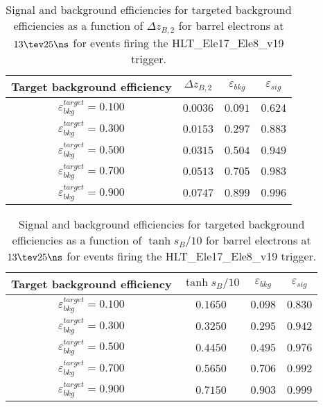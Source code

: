 \clearpage

\begin{table}[!bht]
  \begin{center}
    \begin{tabular}{cccc}
      \hline
      Target background efficiency & $\Delta z_{B,2}$ & $\varepsilon_{bkg}$ & $\varepsilon_{sig}$ \\ 
      \hline
      $\varepsilon_{bkg}^{target} = 0.100$ & $  0.0036$ & $0.091$ & $0.624$ \\
      $\varepsilon_{bkg}^{target} = 0.300$ & $  0.0153$ & $0.297$ & $0.883$ \\
      $\varepsilon_{bkg}^{target} = 0.500$ & $  0.0315$ & $0.504$ & $0.949$ \\
      $\varepsilon_{bkg}^{target} = 0.700$ & $  0.0513$ & $0.705$ & $0.983$ \\
      $\varepsilon_{bkg}^{target} = 0.900$ & $  0.0747$ & $0.899$ & $0.996$ \\
      \hline
    \end{tabular}
    \caption{Signal and background efficiencies for targeted background efficiencies as a function of $\Delta z_{B,2}$ for barrel electrons at $13\tev 25\ns$ for events firing the HLT\_Ele17\_Ele8\_v19 trigger.}
    \label{tab:eff_rej_z2B_beam_13_25_trigger_17_8_B}
  \end{center}
\end{table}

\clearpage

\begin{table}[!bht]
  \begin{center}
    \begin{tabular}{cccc}
      \hline
      Target background efficiency & $\tanh{s_B/10}$ & $\varepsilon_{bkg}$ & $\varepsilon_{sig}$ \\ 
      \hline
      $\varepsilon_{bkg}^{target} = 0.100$ & $  0.1650$ & $0.098$ & $0.830$ \\
      $\varepsilon_{bkg}^{target} = 0.300$ & $  0.3250$ & $0.295$ & $0.942$ \\
      $\varepsilon_{bkg}^{target} = 0.500$ & $  0.4450$ & $0.495$ & $0.976$ \\
      $\varepsilon_{bkg}^{target} = 0.700$ & $  0.5650$ & $0.706$ & $0.992$ \\
      $\varepsilon_{bkg}^{target} = 0.900$ & $  0.7150$ & $0.903$ & $0.999$ \\
      \hline
    \end{tabular}
    \caption{Signal and background efficiencies for targeted background efficiencies as a function of $\tanh{s_B/10}$ for barrel electrons at $13\tev 25\ns$ for events firing the HLT\_Ele17\_Ele8\_v19 trigger.}
    \label{tab:eff_rej_sB_beam_13_25_trigger_17_8_B}
  \end{center}
\end{table}

